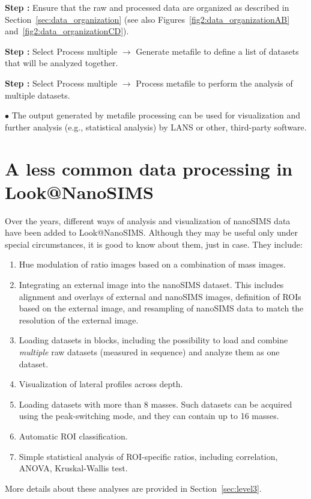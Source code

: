 \documentclass[a4paper, 11pt]{article}
\newcommand{\lans}[1]{{\color{magenta}#1}}
\newcommand{\lanscb}[1]{{\color{darkgreen}#1}}
\newcommand{\lanstf}[1]{{\color{cyan}#1}}
\newcommand\ra{\rightarrow}
\newcommand\addon[1]{-- {\small #1}}
\newcounter{step}
\newcommand\s{\addtocounter{step}{1}\vskip5pt\noindent\textbf{Step \thestep:}{ }}
\newcommand\bul{\vskip5pt\noindent$\bullet${ }}
\begin{document}
\s Ensure that the raw and processed data are organized as described in Section~\ref{sec:data_organization} (see also Figures~\ref{fig2:data_organizationAB} and~\ref{fig2:data_organizationCD}).

\s Select \lans{Process multiple} $\ra$ \lans{Generate metafile} to define a list of datasets that will be analyzed together.


\s Select \lans{Process multiple} $\ra$ \lans{Process metafile} to perform the analysis of multiple datasets.

%
\bul
The output generated by metafile processing can be used for visualization and further analysis (e.g., statistical analysis) by LANS or other, third-party software.


\section{A less common data processing in Look@NanoSIMS}

Over the years, different ways of analysis and visualization of nanoSIMS data have been added to Look@NanoSIMS. Although they may be useful only under special circumstances, it is good to know about them, just in case. They include:

\begin{enumerate}

\item \lanscb{Hue modulation} of ratio images based on a combination of mass images.

\item Integrating an \lans{external image} into the nanoSIMS dataset. This includes \lans{alignment} and \lans{overlays} of external and nanoSIMS images, definition of \lanstf{ROIs based on the external image}, and \lans{resampling} of nanoSIMS data to match the resolution of the external image.

\item Loading datasets in \lans{blocks}, including the possibility to load and combine \emph{multiple} raw datasets (measured in sequence) and analyze them as one dataset.

\item Visualization of \lanscb{lateral profiles across depth}.

\item Loading datasets with more than 8 masses. Such datasets can be acquired using the peak-switching mode, and they can contain up to 16 masses.

\item Automatic ROI classification.

\item Simple statistical analysis of ROI-specific ratios, including correlation, ANOVA, Kruskal-Wallis test.

\end{enumerate}
%
More details about these analyses are provided in Section~\ref{sec:level3}.
\end{document}
